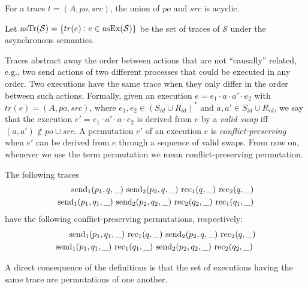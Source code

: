 \begin{proposition}
For a trace $t=(A,po,src)$, the union of $po$ and $src$ is acyclic.
\end{proposition}

Let $\mathrm{asTr}({\mathcal{S}})={\{ tr(e):e\in \mathrm{asEx}({\mathcal{S}}) \}}$ be the set of traces of $\mathcal{S}$ under the asynchronous semantics.

Traces abstract away the order between actions that are not ``causally'' related, e.g., two send actions of two different processes that could be executed in any order. 
%
Two executions have the same trace when they only differ in the order between such actions.
Formally, given an execution $e=e_1\cdot a\cdot a'\cdot e_2$ with $tr(e)=(A,po,src)$, where $e_1, e_2\in (S_{id}\cup R_{id})^*$ and $a,a'\in S_{id}\cup R_{id}$, we say that the execution $e'=e_1\cdot a'\cdot a\cdot e_2$ is derived from $e$ by a \emph{valid swap} iff $(a,a')\not\in po\cup src$. A permutation $e'$ of an execution $e$ is \emph{conflict-preserving} when $e'$ can be derived from $e$ through a sequence of valid swaps. 
From now on, whenever we use the term permutation we mean conflict-preserving permutation.

\begin{example}\label{ex:perm}
The following traces 
\begin{align*}
\send{1}{p_1,q,\_}\ 
\send{2}{p_2,q,\_}\ 
\rec{1}{q,\_}\ 
\rec{2}{q,\_} \\
\send{1}{p_1,q_1,\_}\ 
\send{2}{p_2,q_2,\_}\ 
\rec{2}{q_2,\_}\ 
\rec{1}{q_1,\_} 
\end{align*}
have the following conflict-preserving permutations, respectively:
\begin{align*}
\send{1}{p_1,q_1,\_}\ 
\rec{1}{q,\_}\ 
\send{2}{p_2,q,\_}\ 
\rec{2}{q,\_} \\
\send{1}{p_1,q_1,\_}\ 
\rec{1}{q_1,\_}\ 
\send{2}{p_2,q_2,\_}\ 
\rec{2}{q_2,\_}\ 
\end{align*}
\end{example}

A direct consequence of the definitions is that the set of executions having the same trace are permutations of one another. 

